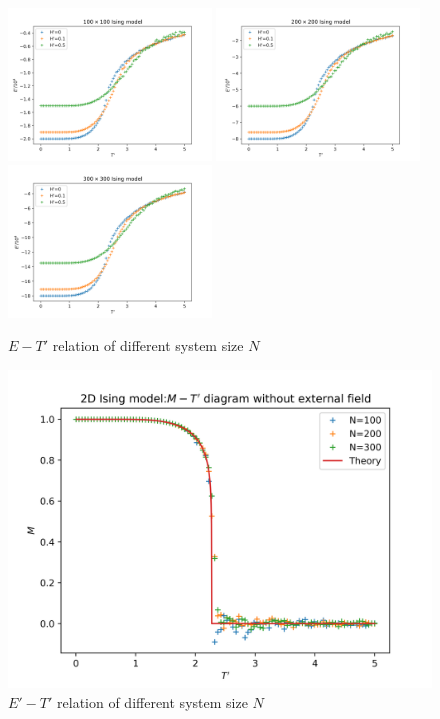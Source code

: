 \documentclass[11pt]{article}
\begin{document}
\begin{figure}
    \centering
    \includegraphics[width=0.48\textwidth]{plots/E-T_withB_diagram(latest,100).png}\hfill
    \includegraphics[width=0.48\textwidth]{plots/E-T_withB_diagram(latest,200).png}\hfill
    \includegraphics[width=0.48\textwidth]{plots/E-T_withB_diagram(latest,300).png}
    \caption{$E-T'$ relation of different system size $N$}
    \label{E-T/N}
\end{figure}

\begin{figure}
    \centering
    \includegraphics[width=0.8\linewidth]{plots/2D Ising model without external field.png}
    \caption{$E'-T'$ relation of different system size $N$}
    \label{noH}
\end{figure}
\end{document}
